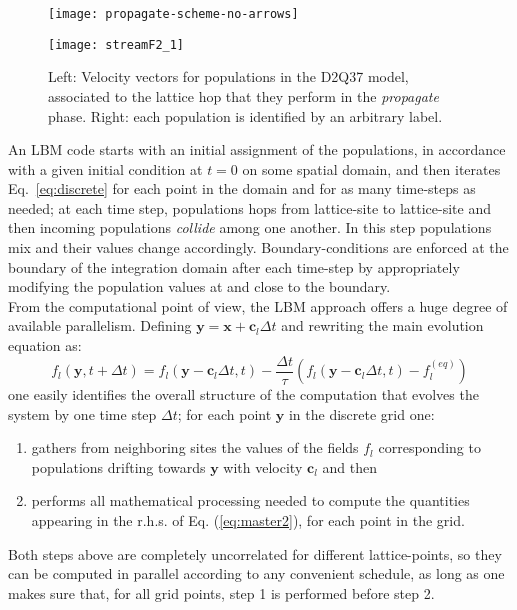 \documentclass{elsarticle}
\newcommand{\benu}{\begin{enumerate}}
\newcommand{\eenu}{\end{enumerate}}
\newcommand{\dt}{{\Delta t}}
\begin{document}
%
\begin{figure*}[!t]
\begin{minipage}{0.45\textwidth}
\texttt{[image: propagate-scheme-no-arrows]}
\end{minipage}
%
\hspace*{5mm}
%
\begin{minipage}{0.45\textwidth}
\texttt{[image: streamF2\_1]}
\end{minipage}
%
\caption{Left: Velocity vectors for populations in the D2Q37 model,
associated to the lattice hop that they perform in the {\em propagate} phase.
Right: each population is identified by an arbitrary label.}
\label{streamscheme}
\end{figure*}
%

An LBM code starts with an initial assignment of the populations, in accordance
with a given initial condition at $t = 0$ on some spatial domain, and then
iterates Eq.~\ref{eq:discrete} for each point in the domain and for as many
time-steps as needed;  at each time step, populations hops from lattice-site to
lattice-site and then incoming populations {\em collide} among one another. In
this step populations mix and their values change accordingly. 
Boundary-conditions are
enforced at the boundary of the integration domain after each time-step
by appropriately modifying the population values at and close to the boundary.\\

From the computational point of view, the LBM approach offers a
huge degree of available  parallelism.
%
Defining ${\bm y} = {\bm x}+ {\bm c}_{l} \dt$ and rewriting the main
evolution equation as:
%
\begin{equation}
f_{l}({\bm y}, t+\dt) = f_{l}({\bm y} - {\bm c}_{l} \dt,t) 
-\frac{\dt}{\tau}\left(f_{l}({\bm y} - {\bm c}_{l} \dt,t) - f_l^{(eq)}\right)
\label{eq:master2}
\end{equation}
%
one easily identifies the overall structure of the computation that evolves the
system by one time step $\dt$; for each point ${\bm y}$ in the discrete grid one:
%
\benu
\item gathers from neighboring sites the values of the fields $f_l$
      corresponding to populations drifting towards ${\bm y}$ with velocity
      ${\bm c}_l$ and then
%
\item performs all mathematical processing needed to compute the quantities 
      appearing in the r.h.s. of Eq. (\ref{eq:master2}), for each point in the
      grid.
\eenu
%
Both steps above are completely uncorrelated 
for different lattice-points, so they can be computed in 
parallel according to any convenient schedule, as long as one makes 
sure that, for all grid points, step 1 is performed before step 2.\\ 
%
\end{document}
